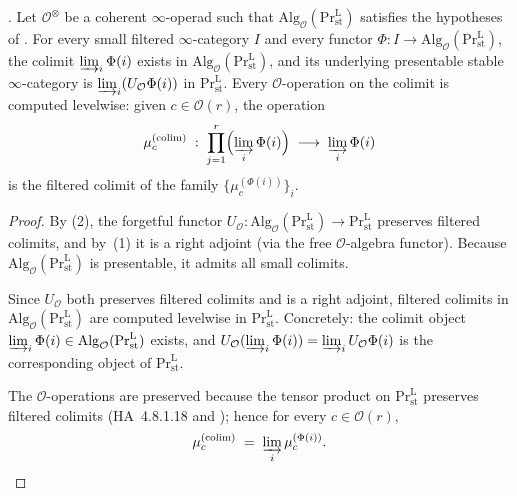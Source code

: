 \begin{proposition}
\label{v4-arith:tate:prop:colim-preserves-O-alg}
\ClaimStatusProvedHere. Let \(\mathcal{O}^{\otimes}\) be a coherent
\(\infty\)-operad such that
\(\mathrm{Alg}_{\mathcal{O}}(\mathrm{Pr}^{\mathrm{L}}_{\mathrm{st}})\)
satisfies the hypotheses of
. For every small
filtered \(\infty\)-category \(I\) and every functor
\(\Phi:I\to\mathrm{Alg}_{\mathcal{O}}(\mathrm{Pr}^{\mathrm{L}}_{\mathrm{st}})\),
the colimit \(\varinjlim_{i}\Phi(i)\) exists in
\(\mathrm{Alg}_{\mathcal{O}}(\mathrm{Pr}^{\mathrm{L}}_{\mathrm{st}})\),
and its underlying presentable stable \(\infty\)-category is
\(\varinjlim_{i}(U_{\mathcal{O}}\Phi(i))\) in
\(\mathrm{Pr}^{\mathrm{L}}_{\mathrm{st}}\). Every \(\mathcal{O}\)-operation
on the colimit is computed levelwise: given
\(c\in\mathcal{O}(r)\), the operation
\[
\mu_{c}^{(\mathrm{colim})}\;:\;\prod_{j=1}^{r}\Bigl(\varinjlim_{i}\Phi(i)\Bigr)\;\longrightarrow\;\varinjlim_{i}\Phi(i)
\]
is the filtered colimit of the family
\(\{\mu_{c}^{(\Phi(i))}\}_{i}\).
\end{proposition}

\begin{proof}
By (2), the forgetful
functor
\(U_{\mathcal{O}}:\mathrm{Alg}_{\mathcal{O}}(\mathrm{Pr}^{\mathrm{L}}_{\mathrm{st}})\to\mathrm{Pr}^{\mathrm{L}}_{\mathrm{st}}\)
preserves filtered colimits, and by~(1) it is a right adjoint (via
the free \(\mathcal{O}\)-algebra functor). Because
\(\mathrm{Alg}_{\mathcal{O}}(\mathrm{Pr}^{\mathrm{L}}_{\mathrm{st}})\)
is presentable, it admits all small colimits.

Since \(U_{\mathcal{O}}\) both preserves filtered colimits and is a
right adjoint, filtered colimits in
\(\mathrm{Alg}_{\mathcal{O}}(\mathrm{Pr}^{\mathrm{L}}_{\mathrm{st}})\)
are computed levelwise in \(\mathrm{Pr}^{\mathrm{L}}_{\mathrm{st}}\).
Concretely: the colimit object
\(\varinjlim_{i}\Phi(i)\in\mathrm{Alg}_{\mathcal{O}}(\mathrm{Pr}^{\mathrm{L}}_{\mathrm{st}})\)
exists, and \(U_{\mathcal{O}}(\varinjlim_{i}\Phi(i))=\varinjlim_{i}U_{\mathcal{O}}\Phi(i)\)
is the corresponding object of
\(\mathrm{Pr}^{\mathrm{L}}_{\mathrm{st}}\).

The \(\mathcal{O}\)-operations are preserved because the tensor
product on \(\mathrm{Pr}^{\mathrm{L}}_{\mathrm{st}}\) preserves
filtered colimits (HA~4.8.1.18 and
); hence for every
\(c\in\mathcal{O}(r)\),
\[
\mu_{c}^{(\mathrm{colim})}\;=\;\varinjlim_{i}\mu_{c}^{(\Phi(i))}.
\]
\end{proof}

